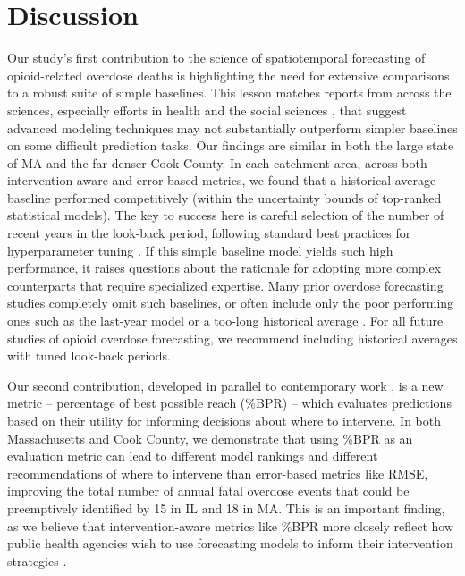 \section{Discussion}\label{discussion}

Our study's first contribution to the science of spatiotemporal forecasting of opioid-related overdose deaths is highlighting the need for extensive comparisons to a robust suite of simple baselines. This lesson matches reports \citep{handClassifierTechnologyIllusion2006,rudinStopExplainingBlack2019} from across the sciences, especially efforts in health \citep{christodoulouSystematicReviewShows2019,nusinoviciLogisticRegressionWas2020} and the social sciences \citep{salganikMeasuringPredictabilityLife2020}, that suggest advanced modeling techniques may not substantially outperform simpler baselines on some difficult prediction tasks. Our findings are similar in both the large state of MA and the far denser Cook County. In each catchment area, across both intervention-aware and error-based metrics, we found that a historical average baseline performed competitively (within the uncertainty bounds of top-ranked statistical models). The key to success here is careful selection of the number of recent years in the look-back period, following standard best practices for hyperparameter tuning \citep{probstTunabilityImportanceHyperparameters2018,raschkaModelEvaluationModel2020}. If this simple baseline model yields such high performance, it raises questions about the rationale for adopting more complex counterparts that require specialized expertise. Many prior overdose forecasting studies \citep{allenTranslatingPredictiveAnalytics2023,bauerSmallAreaForecasting2023} completely omit such baselines, or often include only the poor performing ones such as the last-year \citep{marksIdentifyingCountiesRisk2021} model or a too-long historical average \citep{ertugrulCASTNetCommunityAttentiveSpatioTemporal2019}. For all future studies of opioid overdose forecasting, we recommend including historical averages with tuned look-back periods.

Our second contribution, developed in parallel to contemporary work \citep{marshallPreventingOverdoseUsing2022}, is a new metric -- percentage of best possible reach (\%BPR) -- which evaluates predictions based on their utility for informing decisions about where to intervene. In both Massachusetts and Cook County, we demonstrate that using \%BPR as an evaluation metric can lead to different model rankings and different recommendations of where to intervene than error-based metrics like RMSE, improving the total number of annual fatal overdose events that could be preemptively identified by 15 in IL and 18 in MA. This is an important finding, as we believe that intervention-aware metrics like \%BPR more closely reflect how public health agencies wish to use forecasting models to inform their intervention strategies \citep{allenTranslatingPredictiveAnalytics2023}.

